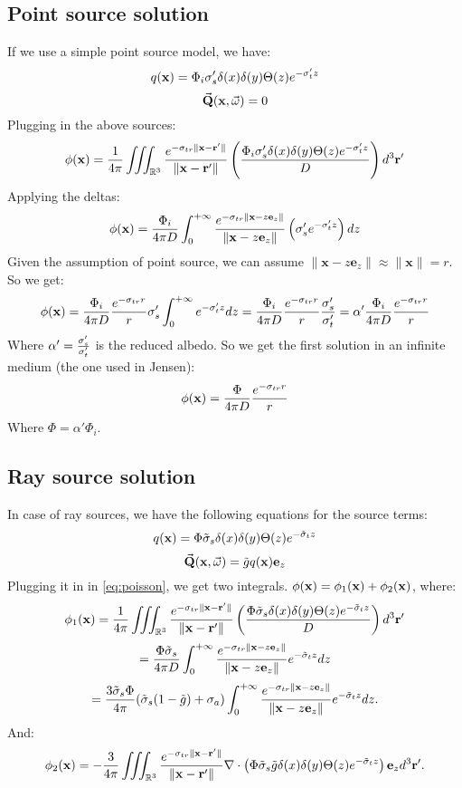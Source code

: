 \documentclass[10pt,a4paper]{article}
\begin{document}
\subsection{Point source solution}
If we use a simple point source model, we have:
$$
{q}(\mathbf{x}) = \Phi_i {\sigma}'_s \delta(x) \delta(y) \Theta(z) e^{-{\sigma}'_t z}
$$
$$
\vec{\mathbf{Q}}(\mathbf{x}, \vec{\omega}) = 0
$$
Plugging in the above sources:
$$
{\phi}(\mathbf{x}) = \frac{1}{4 \pi} \iiint_{\mathbb{R}^3} \frac{e^{-\sigma_{tr} \|\mathbf{x} - \mathbf{r}' \|}}{\|\mathbf{x} - \mathbf{r}' \|} \left(   \frac{\Phi_i {\sigma}'_s \delta(x) \delta(y) \Theta(z) e^{-{\sigma}'_t z}}{D} \right) d^3 \mathbf{r}'
$$
Applying the deltas:
$$
{\phi}(\mathbf{x}) = \frac{\Phi_i}{4 \pi D} \int_{0}^{+\infty} \frac{e^{-\sigma_{tr} \|\mathbf{x} - z \mathbf{e}_z \|}}{\|\mathbf{x} - z \mathbf{e}_z  \|} \left(  {\sigma}'_s e^{-{\sigma}'_t z} \right) dz
$$
Given the assumption of point source, we can assume $\|\mathbf{x} - z \mathbf{e}_z \| \approx \|\mathbf{x}\| = r$. So we get:
$$
{\phi}(\mathbf{x}) = \frac{\Phi_i}{4 \pi D} \frac{e^{-\sigma_{tr} r}}{r} {\sigma}'_s \int_{0}^{+\infty} e^{-{\sigma}'_t z}  dz = \frac{\Phi_i}{4 \pi D} \frac{e^{-\sigma_{tr} r}}{r} \frac{{\sigma}'_s}{{\sigma}'_t} = \alpha' \frac{\Phi_i}{4 \pi D} \frac{e^{-\sigma_{tr} r}}{r}
$$
Where $\alpha' = \frac{{\sigma}'_s}{{\sigma}'_t}$ is the reduced albedo. So we get the first solution in an infinite medium (the one used in Jensen):
$$
{\phi}(\mathbf{x}) = \frac{\Phi}{4 \pi D} \frac{e^{-\sigma_{tr} r}}{r}
$$
Where $\Phi = \alpha' \Phi_i$.
\subsection{Ray source solution}
In case of ray sources, we have the following equations for the source terms:
$$
{q}(\mathbf{x}) = \Phi \tilde{\sigma}_s \delta(x) \delta(y) \Theta(z) e^{-\tilde{\sigma}_t z}
$$
$$
\vec{\mathbf{Q}}(\mathbf{x}, \vec{\omega}) = \tilde{g} {q}(\mathbf{x}) \mathbf{e}_z
$$
Plugging it in in \ref{eq:poisson}, we get two integrals. ${\phi}(\mathbf{x}) = {\phi_1}(\mathbf{x}) + {\phi_2}(\mathbf{x})$, where:
$$
{\phi_1}(\mathbf{x}) = \frac{1}{4 \pi} \iiint_{\mathbb{R}^3} \frac{e^{-\sigma_{tr} \|\mathbf{x} - \mathbf{r}' \|}}{\|\mathbf{x} - \mathbf{r}' \|} \left(   \frac{\Phi \tilde{\sigma}_s \delta(x) \delta(y) \Theta(z) e^{-\tilde{\sigma}_t z}}{D} \right) d^3 \mathbf{r}'
$$
$$
= \frac{\Phi \tilde{\sigma}_s}{4 \pi D} \int_{0}^{+\infty} \frac{e^{-\sigma_{tr} \|\mathbf{x} - z \mathbf{e}_z  \|}}{\|\mathbf{x} - z \mathbf{e}_z  \|}  e^{-\tilde{\sigma}_t z}  dz
$$
$$
= \frac{3\tilde{\sigma}_s \Phi}{4 \pi} (\tilde{\sigma}_s (1 - \tilde{g}) + \sigma_a) \int_{0}^{+\infty} \frac{e^{-\sigma_{tr} \|\mathbf{x} - z \mathbf{e}_z  \|}}{\|\mathbf{x} - z \mathbf{e}_z  \|}  e^{-\tilde{\sigma}_t z}  dz.
$$
And:
$$
{\phi_2}(\mathbf{x}) = -\frac{3}{4 \pi} \iiint_{\mathbb{R}^3}  \frac{e^{-\sigma_{tr} \|\mathbf{x} - \mathbf{r}' \|}}{\|\mathbf{x} - \mathbf{r}' \|} \nabla \cdot \left(  \Phi \tilde{\sigma}_s \tilde{g} \delta(x) \delta(y) \Theta(z) e^{-\tilde{\sigma}_t z} \right)    \mathbf{e}_z d^3 \mathbf{r}'.
$$
\end{document}
